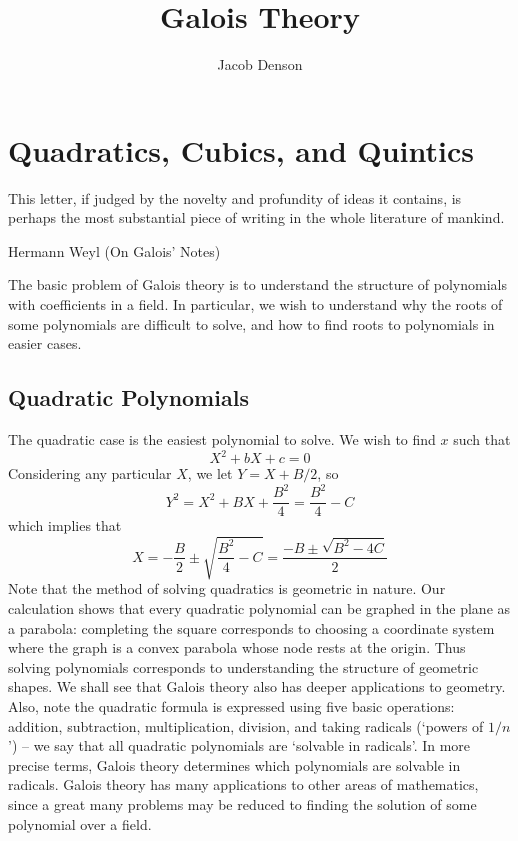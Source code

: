 

\title{Galois Theory}
\author{Jacob Denson}



\maketitle
\tableofcontents

\chapter{Quadratics, Cubics, and Quintics}


\epigraph{This letter, if judged by the novelty and profundity of ideas it contains, is perhaps the most substantial piece of writing in the whole literature of mankind.}{Hermann Weyl (On Galois' Notes)}

The basic problem of Galois theory is to understand the structure of polynomials with coefficients in a field. In particular, we wish to understand why the roots of some polynomials are difficult to solve, and how to find roots to polynomials in easier cases.

\section{Quadratic Polynomials}

The quadratic case is the easiest polynomial to solve. We wish to find $x$ such that
%
\[ X^2 + bX + c  = 0 \]
%
Considering any particular $X$, we let $Y = X + B/2$, so
%
\[ Y^2 = X^2 + BX + \frac{B^2}{4} = \frac{B^2}{4} - C \]
%
which implies that
%
\[ X = -\frac{B}{2} \pm \sqrt{\frac{B^2}{4} - C} = \frac{-B \pm \sqrt{B^2 - 4C}}{2} \]
%
Note that the method of solving quadratics is geometric in nature. Our calculation shows that every quadratic polynomial can be graphed in the plane as a parabola: completing the square corresponds to choosing a coordinate system where the graph is a convex parabola whose node rests at the origin. Thus solving polynomials corresponds to understanding the structure of geometric shapes. We shall see that Galois theory also has deeper applications to geometry. Also, note the quadratic formula is expressed using five basic operations: addition, subtraction, multiplication, division, and taking radicals (`powers of $1/n$') -- we say that all quadratic polynomials are `solvable in radicals'. In more precise terms, Galois theory determines which polynomials are solvable in radicals. Galois theory has many applications to other areas of mathematics, since a great many problems may be reduced to finding the solution of some polynomial over a field.

